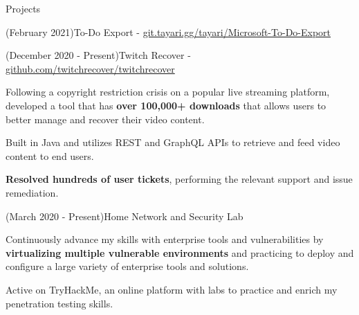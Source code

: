\documentclass{article}
\newlength{\tabin}
\newlength{\secsep}
\newcommand{\lineunder}{\vspace*{-8pt} \\ \hspace*{-6pt} \hrulefill \\ \vspace*{-15pt}}
\newenvironment{tabbedsection}[1]{
  \begin{list}{}{
      \setlength{\itemsep}{0pt}
      \setlength{\labelsep}{0pt}
      \setlength{\labelwidth}{0pt}
      \setlength{\leftmargin}{\tabin}
      \setlength{\rightmargin}{\tabin}
      \setlength{\listparindent}{0pt}
      \setlength{\parsep}{0pt}
      \setlength{\parskip}{0pt}
      \setlength{\partopsep}{0pt}
      \setlength{\topsep}{#1}
    }
  \item[]
}{\end{list}}
\newenvironment{resume_section}[1]{
  \filbreak
  \vspace{2\secsep}
  \textsc{\color{blue}\large#1}
  \lineunder
  \begin{tabbedsection}{\secsep}
}{\end{tabbedsection}}
\newenvironment{resume_subsection}[2]{
  \textbf{\color{BlueViolet}#2} \hfill {\normalsize #1} \hspace{-5em} 
  \begin{tabbedsection}{0.5\secsep}
  \begin{subitems}
}{\end{subitems}\end{tabbedsection}}
\newenvironment{subitems}{
  \renewcommand{\labelitemi}{-}
  \begin{itemize}
      \setlength{\labelsep}{1em}
}{\end{itemize}}
\begin{document}
\begin{resume_section}{Projects}
\begin{resume_subsection}{(February 2021)}{To-Do Export - \faGitlab \hspace{0.01cm} \href{https://git.tayari.gg/tayari/Microsoft-To-Do-Export}{git.tayari.gg/tayari/Microsoft-To-Do-Export}}
  	\end{resume_subsection}
  	\vspace{2\secsep}
	\begin{resume_subsection}{(December 2020 - Present)}{Twitch Recover - \faGithub \hspace{0.01cm} \href{https://github.com/twitchrecover/twitchrecover}{github.com/twitchrecover/twitchrecover}}  
        \item Following a copyright restriction crisis on a popular live streaming platform, developed a tool that has \textbf{over 100,000+ downloads} that allows users to better manage and recover their video content.
    	\item Built in Java and utilizes REST and GraphQL APIs to retrieve and feed video content to end users.
    	\item \textbf{Resolved hundreds of user tickets}, performing the relevant support and issue remediation.
	\end{resume_subsection}
	\vspace{2\secsep}
  	\begin{resume_subsection}{(March 2020 - Present)}{Home Network and Security Lab}
        \item Continuously advance my skills with enterprise tools and vulnerabilities by \textbf{virtualizing multiple vulnerable environments} and practicing to deploy and configure a large variety of enterprise tools and solutions. 
  		\item Active on TryHackMe, an online platform with labs to practice and enrich my penetration testing skills.
    \end{resume_subsection}
\end{resume_section}
\end{document}
